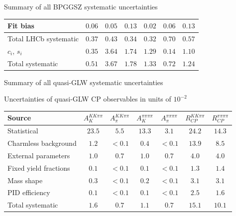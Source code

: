 \documentclass{beamer}
\begin{document}
\begin{frame}{Summary of all BPGGSZ systematic uncertainties}
\begin{center}
\begin{tabular}{lcccccc}
        Fit bias                                                   & $0.06$ & $0.05$ & $0.13$ & $0.02$ & $0.06$ & $0.13$ \\
        \hline
        Total LHCb systematic                                      & $0.37$ & $0.43$ & $0.34$ & $0.32$ & $0.70$ & $0.57$ \\
        \hline
        $c_i$, $s_i$                                               & $0.35$ & $3.64$ & $1.74$ & $1.29$ & $0.14$ & $1.10$ \\
        \hline
        Total systematic                                           & $0.51$ & $3.67$ & $1.78$ & $1.33$ & $0.72$ & $1.24$ \\
        \hline
    \end{tabular}
  \end{center}
\end{frame}

\begin{frame}{Summary of all quasi-GLW systematic uncertainties}
  \begin{center}
    Uncertainties of quasi-GLW CP observables in units of $10^{-2}$
  \end{center}
  \footnotesize
  \vspace{0.02cm}
  \begin{center}
    \begin{tabular}{lcccccc} 
        \hline
        Source & $A_K^{KK\pi\pi}$ & $A_\pi^{KK\pi\pi}$ & $A_K^{\pi\pi\pi\pi}$ & $A_\pi^{\pi\pi\pi\pi}$ & $R_{C\!P}^{KK\pi\pi}$ & $R_{C\!P}^{\pi\pi\pi\pi}$ \\
        \hline
        Statistical                                   & $23.5$ & $5.5$ & $13.3$ & $3.1$ & $24.2$ & $14.3$ \\
        \hline
        Charmless background                          & $1.2$ & $<0.1$\phantom{00}  & $0.4$ & $<0.1$\phantom{00} & $13.9$ & $8.5$ \\
        External parameters                           & $1.0$ & $0.7$ & $1.0$ & $0.7$ & $4.0$ & $4.0$ \\
        Fixed yield fractions                         & $0.1$ & $<0.1$\phantom{00}  & $0.1$ & $<0.1$\phantom{00}  & $1.3$ & $1.4$ \\
        Mass shape                                    & $0.3$ & $<0.1$\phantom{00}  & $0.2$ & $<0.1$\phantom{00}  & $3.1$ & $3.1$ \\
        PID efficiency                                & $0.1$ & $<0.1$\phantom{00}  & $0.1$ & $<0.1$\phantom{00}  & $2.5$ & $1.6$ \\
        \hline
        Total systematic                              & $1.6$ & $0.7$ & $1.1$ & $0.7$ & $15.1$ & $10.1$ \\
        \hline
    \end{tabular}
  \end{center}
\end{frame}
\end{document}

